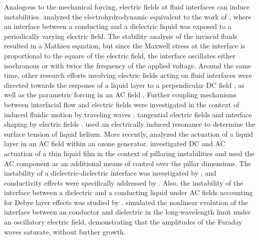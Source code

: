 \documentclass{jfm_arxiv}
\begin{document}
Analogous to the mechanical forcing, electric fields at fluid interfaces can induce instabilities. \citet{Yih1968} analyzed the electrohydrodynamic equivalent to the work of \citeauthor{Benjamin1954}, where an interface between a conducting and a dielectric liquid was exposed to a periodically varying electric field.
The stability analysis of the inviscid fluids resulted in a Mathieu equation, but since the Maxwell stress at the interface is proportional to the square of the electric field, the interface oscillates either isochronous or with twice the frequency of the applied voltage.
Around the same time, other research efforts involving electric fields acting on fluid interfaces were directed towards the response of a liquid layer to a perpendicular DC field \citep{Taylor1965}, as well as the parametric forcing in an AC field \citep{Briskman1968}. 
Further coupling mechanisms between interfacial flow and electric fields were investigated in the context of induced fluidic motion by traveling waves \citep{Melcher1966}, tangential electric fields \citep{Melcher1968} and interface shaping by electric fields \citep{Jones1973}.
\citet{Iino1985} used an electrically induced resonance to determine the surface tension of liquid helium. More recently, \citet{Robinson2000,Robinson2001,Robinson2002} analyzed the actuation of a liquid layer in an AC field within an ozone generator.
\citet{Roberts2009} investigated DC and AC actuation of a thin liquid film in the context of pillaring instabilities and used the AC component as an additional means of control over the pillar dimensions.
The instability of a dielectric-dielectric interface was investigated by \citet{Gambhire2010}, and conductivity effects were specifically addressed by \citet{Gambhire2012}. Also, the instability of the interface between a dielectric and a conducting liquid under AC fields accounting for Debye layer effects was studied by \cite{Gambhire2014}.
\citet{Pillai2018} simulated the nonlinear evolution of the interface between an conductor and dielectric in the long-wavelength limit under an oscillatory electric field, demonstrating that the amplitudes of the Faraday waves saturate, without further growth.
\end{document}
